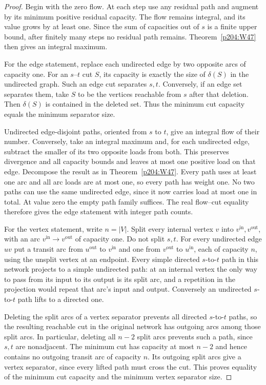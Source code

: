 \documentclass[11pt,oneside,openany]{book}
\theoremstyle{plain}
\theoremstyle{definition}
\theoremstyle{remark}
\begin{document}
\begin{proof}
Begin with the zero flow. At each step use any residual path and
augment by its minimum positive residual capacity. The flow remains
integral, and its value grows by at least one. Since the sum of
capacities out of \(s\) is a finite upper bound, after finitely many
steps no residual path remains. Theorem~\ref{p204:W47} then gives
an integral maximum.

For the edge statement, replace each undirected edge by two opposite
arcs of capacity one. For an \(s\)--\(t\) cut \(S\), its capacity is
exactly the size of \(\delta(S)\) in the undirected graph. Such
an edge cut separates \(s,t\). Conversely, if an edge set separates
them, take \(S\) to be the vertices reachable from \(s\) after that
deletion. Then \(\delta(S)\) is contained in the deleted set.
Thus the minimum cut capacity equals the minimum separator size.

Undirected edge-disjoint paths, oriented from \(s\) to \(t\), give
an integral flow of their number. Conversely, take an integral
maximum and, for each undirected edge, subtract the smaller of its
two opposite loads from both. This preserves divergence and all
capacity bounds and leaves at most one positive load on that edge.
Decompose the result as in Theorem~\ref{p204:W47}. Every path uses at
least one arc and all arc loads are at most one, so every path has
weight one. No two paths can use the same undirected edge, since
it now carries load at most one in total. At value zero the empty
path family suffices. The real flow--cut equality therefore gives
the edge statement with integer path counts.

For the vertex statement, write \(n=|V|\). Split every internal vertex
\(v\) into \(v^{\mathrm{in}},v^{\mathrm{out}}\), with an arc
\(v^{\mathrm{in}}\to v^{\mathrm{out}}\) of capacity one. Do not split
\(s,t\). For every undirected edge \(uv\) put a transit arc from
\(u^{\mathrm{out}}\) to \(v^{\mathrm{in}}\) and one from
\(v^{\mathrm{out}}\) to \(u^{\mathrm{in}}\), each of capacity \(n\),
using the unsplit vertex at an endpoint. Every simple directed
\(s\)-to-\(t\) path in this network projects to a simple undirected
path: at an internal vertex the only way to pass from its input to
its output is its split arc, and a repetition in the projection would
repeat that arc's input and output. Conversely an undirected
\(s\)-to-\(t\) path lifts to a directed one.

Deleting the split arcs of a vertex separator prevents all directed
\(s\)-to-\(t\) paths, so the resulting reachable cut in the original
network has outgoing arcs among those split arcs. In particular,
deleting all \(n-2\) split arcs prevents such a path, since \(s,t\)
are nonadjacent. The minimum cut has capacity at most \(n-2\)
and hence contains no outgoing transit arc of capacity \(n\).
Its outgoing split arcs give a vertex separator, since every lifted
path must cross the cut. This proves equality of the minimum cut
capacity and the minimum vertex separator size.


\end{proof}
\end{document}
